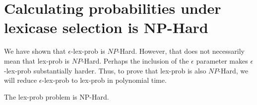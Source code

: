 \documentclass[sigconf]{acmart}
\begin{document}
\section{Calculating probabilities under lexicase selection is NP-Hard}

We have shown that {\sc $\epsilon$-lex-prob} is $NP$-Hard. However, that does not necessarily mean that {\sc lex-prob} is $NP$-Hard. Perhaps the inclusion of the $\epsilon$ parameter makes {\sc $\epsilon$-lex-prob} substantially harder. Thus, to prove that {\sc lex-prob} is also $NP$-Hard, we will reduce {\sc $\epsilon$-lex-prob} to {\sc lex-prob} in polynomial time.

\begin{theorem}
\label{elexicasetheorem}
The {\sc lex-prob} problem is NP-Hard.
\end{theorem}
\end{document}
